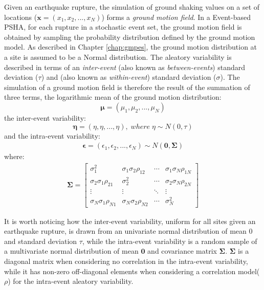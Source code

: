 Given an earthquake rupture, the simulation of ground shaking values on a set of locations ($\bm{x}=(x_{1}, x_{2}, ..., x_{N})$)
forms a \textit{ground motion field}. In a Event-based PSHA, for each rupture in a stochastic event set,
the ground motion field is obtained by sampling the probability distribution defined by the ground motion model.
As described in Chapter \ref{chap:gmpes}, the ground motion distribution at a site is assumed to be a Normal
distribution. The aleatory variability is described in terms of an \textit{inter-event} (also known as \textit{between-events})
standard deviation ($\tau$) and  (also known as \textit{within-event}) standard deviation ($\sigma$).
The simulation of a ground motion field is therefore the result of the summation of three terms, the logarithmic mean of the
ground motion distribution:
\begin{equation}
\bm\mu = (\mu_{1}, \mu_{2}, ..., \mu_{N})
\end{equation}
the inter-event variability:
\begin{equation}
\bm\eta = (\eta, \eta, ..., \eta),\;where\;\eta\sim N(0, \tau)
\end{equation}
and the intra-event variability:
\begin{align}
\bm\epsilon = (\epsilon_{1}, \epsilon_{2}, ..., \epsilon_{N}) \sim N(\bm{0}, \bm\Sigma)
\end{align}
where:
\begin{align}
\bm\Sigma = 
\begin{bmatrix}
\sigma_{1}^2&\sigma_{1}\sigma_{2}\rho_{12}&\cdots &\sigma_{1}\sigma_{N}\rho_{1N} \\
\sigma_{2}\sigma_{1}\rho_{21}&\sigma_{2}^2&\cdots &\sigma_{2}\sigma_{N}\rho_{2N} \\
\vdots & \vdots & \ddots & \vdots\\
\sigma_{N}\sigma_{1}\rho_{N1}&\sigma_{N}\sigma_{2}\rho_{N2}&\cdots &\sigma_{N}^2
\end{bmatrix}
\end{align}

It is worth noticing how the inter-event variability, uniform for all sites given an earthquake rupture, is drawn
from an univariate normal distribution of mean 0 and standard deviation $\tau$, while the intra-event variability
is a random sample of a multivariate normal distribution of mean $\bm{0}$ and covariance matrix $\bm\Sigma$.
$\bm\Sigma$ is a diagonal matrix when considering no correlation in the intra-event variability, while it has non-zero
off-diagonal elements when considering a correlation model($\rho$) for the intra-event aleatory variability.

